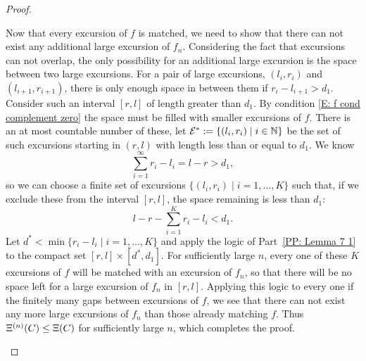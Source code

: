 \begin{proof}
\begin{proofpart} \label{PP: Lemma 7 2}

Now that every excursion of $f$ is matched, 
we need to show that there can not exist any additional large excursion of $f_n$.
Considering the fact that excursions can not overlap,
the only possibility for an additional large excursion is the space between two large excursions.
For a pair of large excursions,
$(l_i, r_i)$ and $(l_{i+1}, r_{i+1})$,
there is only enough space in between them if
$r_i - l_{i+1} > d_1$.
Consider such an interval $[r,l]$ of length greater than $d_1$.
By condition \eqref{E: f cond complement zero} the space must be filled with smaller excursions of $f$.
There is an at most countable number of these,
let $\mathcal{E^*} := \{ (l_i, r_i) \; | \; i \in \mathbb{N} \}$
be the set of such excursions starting in $(r,l)$ with length less than or equal to $d_1$.
We know
\begin{equation} 
\sum_{i=1}^{\infty} r_i - l_i = l - r > d_1,
\end{equation}
so we can choose a finite set of excursions
$\{ (l_i, r_i) \; | \; i = 1, \dots, K \}$
such that, 
if we exclude these from the interval $[r,l]$, 
the space remaining is less than $d_1$:
\begin{equation}
l-r - \sum_{i=1}^{K} r_i - l_i < d_1.
\end{equation}
Let $d^* < \min \{ r_i - l_i \; | \; i = 1, \dots, K \}$
and apply the logic of Part~\ref{PP: Lemma 7 1} to the compact set
$[r, l] \times [d^*, d_1]$.
For sufficiently large $n$, 
every one of these $K$ excursions of $f$ will be matched with an excursion of $f_n$,
so that there will be no space left for a large excursion of $f_n$ in $[r,l]$.
Applying this logic to every one if the finitely many gaps between excursions of $f$,
we see that there can not exist any more large excursions of $f_n$  than those already matching $f$.
Thus $\Xi^{(n)}(C) \leq \Xi(C)$ for sufficiently large $n$,
which completes the proof.
\end{proofpart}

\end{proof}


